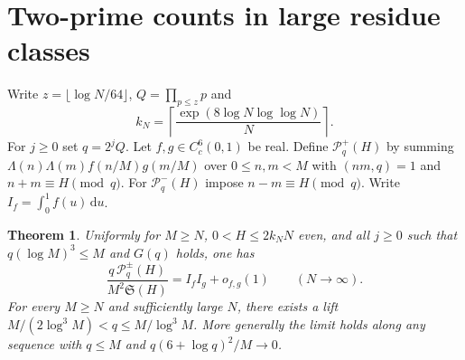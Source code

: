 \documentclass[11pt,a4paper]{article}
\newtheorem{theorem}{Theorem}[section]
\newcommand{\SSg}{\mathfrak S}
\newcommand{\dd}{\,\mathrm d}
\begin{document}
\section{Two-prime counts in large residue classes}\label{sec:congruences}

Write $z=\lfloor\log N/64\rfloor$, $Q=\prod_{p\le z}p$ and
\[
 k_N=\left\lceil\frac{\exp(8\log N\log\log N)}{N}\right\rceil.
\]
For $j\ge0$ set $q=2^jQ$. Let $f,g\in C_c^6(0,1)$ be real.
Define $\mathcal P_q^+(H)$ by summing
$\Lambda(n)\Lambda(m)f(n/M)g(m/M)$ over $0\le n,m<M$ with
$(nm,q)=1$ and $n+m\equiv H\pmod q$. For $\mathcal P_q^-(H)$ impose
$n-m\equiv H\pmod q$. Write $I_f=\int_0^1f(u)\dd u$.

\begin{theorem}\label{th:congruences}
Uniformly for $M\ge N$, $0<H\le 2k_NN$ even, and all $j\ge0$ such
that $q(\log M)^3\le M$ and $G(q)$ holds, one has
\[
  \frac{q\,\mathcal P_q^\pm(H)}{M^2\SSg(H)}=I_f I_g+o_{f,g}(1)
             \qquad(N\to\infty).
\]
For every $M\ge N$ and sufficiently large $N$, there exists a lift
$M/(2\log^3 M)<q\le M/\log^3 M$.
More generally the limit holds along any sequence with $q\le M$ and
$q(6+\log q)^2/M\to0$.
\end{theorem}
\end{document}
